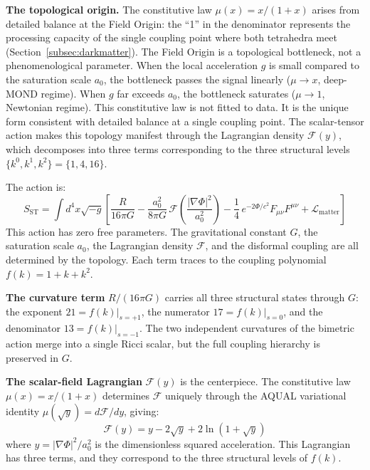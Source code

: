 \documentclass[aps,prd,preprint,superscriptaddress,showpacs,preprintnumbers,amsmath,amssymb,nofootinbib]{revtex4-2}
\begin{document}
\textbf{The topological origin.} The constitutive law $\mu(x) = x/(1+x)$ arises from detailed balance at the Field Origin: the ``1'' in the denominator represents the processing capacity of the single coupling point where both tetrahedra meet (Section~\ref{subsec:darkmatter}). The Field Origin is a topological bottleneck, not a phenomenological parameter. When the local acceleration $g$ is small compared to the saturation scale $a_0$, the bottleneck passes the signal linearly ($\mu \to x$, deep-MOND regime). When $g$ far exceeds $a_0$, the bottleneck saturates ($\mu \to 1$, Newtonian regime). This constitutive law is not fitted to data. It is the unique form consistent with detailed balance at a single coupling point. The scalar-tensor action makes this topology manifest through the Lagrangian density $\mathcal{F}(y)$, which decomposes into three terms corresponding to the three structural levels $\{k^0, k^1, k^2\} = \{1, 4, 16\}$.

The action is:
\begin{equation}
S_{\text{ST}} = \int d^4x \sqrt{-g} \left[ \frac{R}{16\pi G} - \frac{a_0^2}{8\pi G}\,\mathcal{F}\!\left(\frac{|\nabla\Phi|^2}{a_0^2}\right) - \frac{1}{4}\,e^{-2\Phi/c^2} F_{\mu\nu}F^{\mu\nu} + \mathcal{L}_{\text{matter}} \right]
\label{eq:scalar-tensor}
\end{equation}
This action has zero free parameters. The gravitational constant $G$, the saturation scale $a_0$, the Lagrangian density $\mathcal{F}$, and the disformal coupling are all determined by the topology. Each term traces to the coupling polynomial $f(k) = 1 + k + k^2$.

\textbf{The curvature term} $R/(16\pi G)$ carries all three structural states through $G$: the exponent $21 = f(k)|_{s=+1}$, the numerator $17 = f(k)|_{s=0}$, and the denominator $13 = f(k)|_{s=-1}$. The two independent curvatures of the bimetric action merge into a single Ricci scalar, but the full coupling hierarchy is preserved in $G$.

\textbf{The scalar-field Lagrangian} $\mathcal{F}(y)$ is the centerpiece. The constitutive law $\mu(x) = x/(1+x)$ determines $\mathcal{F}$ uniquely through the AQUAL variational identity $\mu(\sqrt{y}) = d\mathcal{F}/dy$, giving:
\begin{equation}
\mathcal{F}(y) = y - 2\sqrt{y} + 2\ln(1 + \sqrt{y})
\label{eq:aqual-lagrangian}
\end{equation}
where $y = |\nabla\Phi|^2/a_0^2$ is the dimensionless squared acceleration. This Lagrangian has three terms, and they correspond to the three structural levels of $f(k)$.
\end{document}
